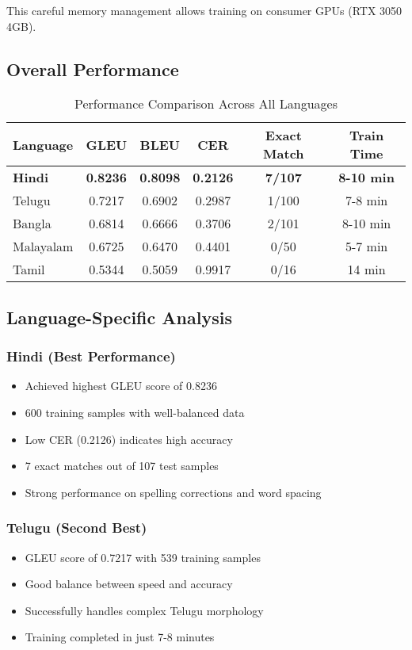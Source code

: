 \documentclass[12pt,a4paper]{article}
\begin{document}
This careful memory management allows training on consumer GPUs (RTX 3050 4GB).

\subsection{Overall Performance}

\begin{table}[H]
\centering
\caption{Performance Comparison Across All Languages}
\begin{tabular}{lccccc}
\toprule
\textbf{Language} & \textbf{GLEU} & \textbf{BLEU} & \textbf{CER} & \textbf{Exact Match} & \textbf{Train Time} \\
\midrule
\textbf{Hindi} & \textbf{0.8236} & \textbf{0.8098} & \textbf{0.2126} & \textbf{7/107} & \textbf{8-10 min} \\
Telugu & 0.7217 & 0.6902 & 0.2987 & 1/100 & 7-8 min \\
Bangla & 0.6814 & 0.6666 & 0.3706 & 2/101 & 8-10 min \\
Malayalam & 0.6725 & 0.6470 & 0.4401 & 0/50 & 5-7 min \\
Tamil & 0.5344 & 0.5059 & 0.9917 & 0/16 & 14 min \\
\bottomrule
\end{tabular}
\end{table}

\subsection{Language-Specific Analysis}

\subsubsection{Hindi (Best Performance)}
\begin{itemize}
    \item Achieved highest GLEU score of 0.8236
    \item 600 training samples with well-balanced data
    \item Low CER (0.2126) indicates high accuracy
    \item 7 exact matches out of 107 test samples
    \item Strong performance on spelling corrections and word spacing
\end{itemize}

\subsubsection{Telugu (Second Best)}
\begin{itemize}
    \item GLEU score of 0.7217 with 539 training samples
    \item Good balance between speed and accuracy
    \item Successfully handles complex Telugu morphology
    \item Training completed in just 7-8 minutes
\end{itemize}
\end{document}
